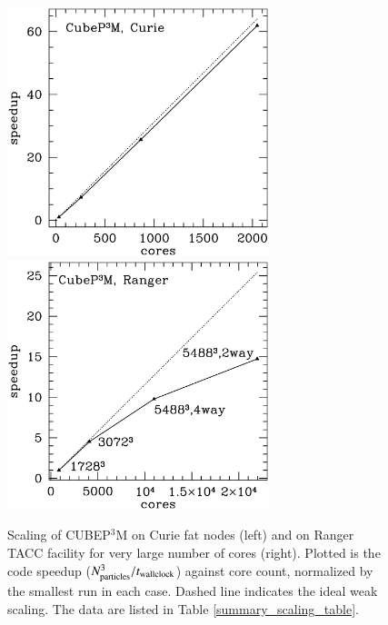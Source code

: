 \documentclass[useAMS,usenatbib]{mn2e}
\begin{document}
\begin{figure}%
  \begin{center}
    \includegraphics[width=3.0in]{graphs/scaling_cubep3m_curie.eps}
    \includegraphics[width=3.0in]{graphs/scaling_cubep3m_new.eps}
  \caption{Scaling of {\small CUBEP$^3$M} on Curie fat nodes (left) and 
    on Ranger TACC facility for very large number of cores (right). Plotted is the code speedup 
    ($N_{\rm particles}^3/t_{\rm wallclock}$) against core count, normalized by the smallest run 
    in each case. Dashed line indicates the ideal weak 
    scaling. The data are listed in Table \ref{summary_scaling_table}.
    \label{scaling}
}
\end{center}
\end{figure}
\end{document}
